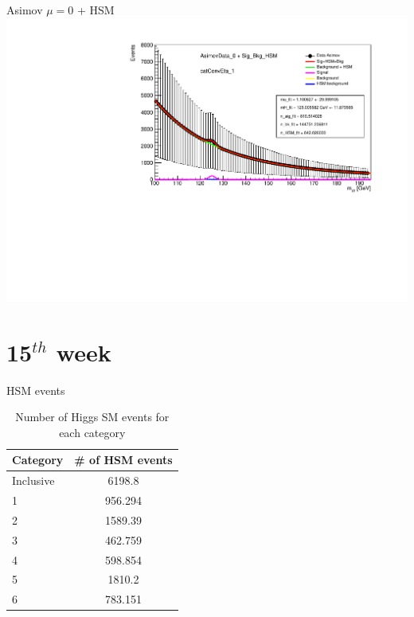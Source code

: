 \documentclass[10pt,UKenglish, leqno, xcolor = dvipsnames]{beamer}
\begin{document}
		\begin{frame}{Asimov $\mu=0$ + HSM}
			\vfill
			\centering
			\includegraphics[width=\textwidth]{../images/week_14/HSM_AsimovData_0_catConvEta_1.pdf}
			\vfill
		\end{frame}
	
	\section{15$^{th}$ week}
	\SectionPage
	
		\begin{frame}{HSM events}
			\vfill
			\centering
			\begin{table}[tbp]
				\centering
				\begin{tabular}{lc}
					\toprule[1.5pt]
					Category	& \# of HSM events	\\
					\midrule
					Inclusive	& 6198.8			\\
					1 			& 956.294 			\\
					2 			& 1589.39 			\\
					3 			& 462.759			\\
					4		 	& 598.854			\\
					5 			& 1810.2			\\
					6 			& 783.151			\\
					\bottomrule[1.5pt]
				\end{tabular}
				\caption{Number of Higgs SM events for each category}
			\end{table}
			\vfill
		\end{frame}	
	
\end{document}
